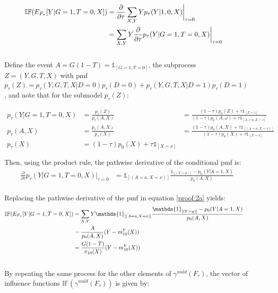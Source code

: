 \begin{propproof}
\begin{align}\label{proof:2a}
    \mathbb{IF}(E_{F_{\tau}}[Y|G=1,T=0,X])  &= \frac{\partial}{\partial \tau}\sum_{X,Y}Y p_{\tau}(Y|1,0,X)\bigg|_{\tau=0} &\notag \\
    &= \sum_{X,Y}Y \frac{\partial}{\partial \tau} p_{\tau}(Y|G=1,T=0,X)\bigg|_{\tau=0}
\end{align}\\

Define the event $A=G(1-T)=\mathds{1}_{[G=1,T=0]}$, the subprocess $Z=(Y,G,T,X)$ with pmf $p_{\tau}(Z)=p_{\tau}(Y,G,T,X|D=0)p_{\tau}(D=0)+p_{\tau}(Y,G,T,X|D=1)p_{\tau}(D=1)$ , and note that for the submodel $p_{\tau}(Z)$:

\begin{align*}
    p_{\tau}(Y|G=1,T=0,X)&=\frac{p_{\tau}(Z)}{p_{\tau}(A,X)} &= \frac{(1-\tau) p_0(Z) + \tau \mathds{1}_{[Z=z]}}{(1-\tau) p_0(A, \omega) + \tau \mathds{1}_{[A=a,Z=z]}}  \\
    p_{\tau}(A,X)&=\frac{p_{\tau}(A,X)}{p_{\tau}(X)} &=\frac{(1-\tau) p_0(A,X) + \tau \mathds{1}_{[(A=a,X=x)]}}{(1-\tau) p_0(X) + \tau \mathds{1}_{[X=x]}}  \\
    p_{\tau}(X)&=(1-\tau) p_0(X) + \tau \mathds{1}_{[X=x]}
\end{align*}

Then, using the product rule, the pathwise derivative of the conditional pmf is:\\

\begin{align*}
    \frac{\partial}{\partial \tau} p_{\tau}(Y|G=1,T=0,X)\bigg|_{\tau=0} &= \mathds{1}_{[(A=a,X=x)]}\frac{\mathds{1}_{[(Y=y)]}-p_0(Y|A=1,X)}{p_0(A,X)}
\end{align*}\\

Replacing the pathwise derivative of the pmf in equation \ref{proof:2a} yields:\\

\begin{align}\label{proof:2b}
    \mathbb{IF}(E_{F_{\tau}}[Y|G=1,T=0,X])  &= \sum_{X,Y}Y \mathds{1}_{[(A=a,X=x)]}\frac{\mathds{1}_{[(Y=y)]}-p_0(Y|A=1,X)}{p_0(A,X)}&\notag \\
    &= \frac{A}{p_0(A,X)}(Y-m^Y_{10}(X)) &\notag\\
    &= \frac{G(1-T)}{\pi_{10}(X)}(Y-m^Y_{10}(X))
\end{align}\\

By repeating the same process for the other elements of $\gamma^{wald}(F_{\tau})$, the vector of influence functions $\mathbb{IF}(\gamma^{wald}(F_{\tau}))$ is given by:\\


\end{propproof}
